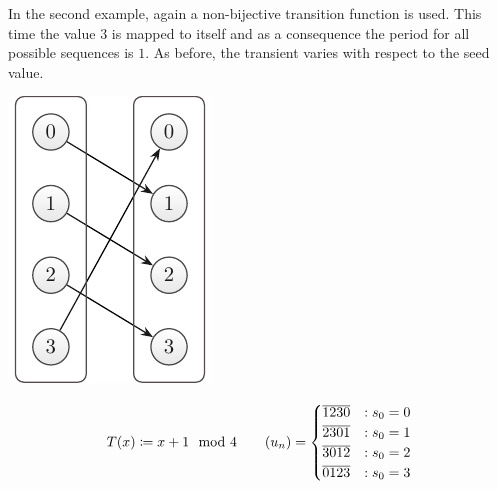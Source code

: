 \documentclass{stdlocal}
\begin{document}
    \noindent
    In the second example, again a non-bijective transition function is used.
    This time the value $3$ is mapped to itself and as a consequence the period for all possible sequences is $1$.
    As before, the transient varies with respect to the seed value.

    \medskip
    \begin{minipage}{0.2\textwidth}
      \includegraphics[width=\textwidth]{figures/periodicity_example_c.pdf}
    \end{minipage}
    \hfill
    \begin{minipage}{0.73\textwidth}
      \[
        T(x) \coloneqq x + 1 \mod 4
      \qquad
        (u_n) =
        \begin{cases}
          \overline{1230} &: s_0 = 0 \\
          \overline{2301} &: s_0 = 1 \\
          \overline{3012} &: s_0 = 2 \\
          \overline{0123} &: s_0 = 3
        \end{cases}
      \]
    \end{minipage}
    \medskip
\end{document}
